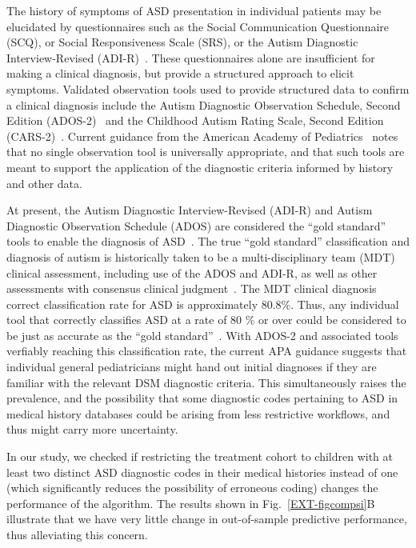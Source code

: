 \documentclass[onecolumn,,10pt]{IEEEtran}
\begin{document}
The history of symptoms of  ASD presentation in individual patients may be elucidated by questionnaires such as
the Social Communication Questionnaire (SCQ), or Social Responsiveness
Scale (SRS), or the Autism Diagnostic Interview-Revised (ADI-R)~\cite{hyman2020identification}. These questionnaires alone are insufficient for making a clinical diagnosis, but provide a structured approach to
elicit symptoms. Validated observation tools used to provide structured data to confirm a clinical diagnosis include the Autism Diagnostic Observation Schedule,
Second Edition (ADOS-2)~\cite{esler2015autism} and the
Childhood Autism Rating Scale,
Second Edition (CARS-2)~\cite{chlebowski2010using}. Current guidance from the American Academy of Pediatrics~\cite{hyman2020identification}   notes that no single
observation tool is universally appropriate,
and that such tools are meant to support the application of the diagnostic criteria informed by history
and other data.

At present, the Autism Diagnostic Interview-Revised (ADI-R) and Autism Diagnostic Observation
Schedule (ADOS) are considered the ``gold
standard'' tools to enable the  diagnosis of ASD~\cite{falkmer2013diagnostic}. 
The true  ``gold standard'' classification and diagnosis of autism is historically taken to be a multi-disciplinary team (MDT) clinical assessment, including use of the ADOS and
ADI-R, as well as other assessments with consensus clinical judgment~\cite{falkmer2013diagnostic}.  
The MDT clinical diagnosis correct classification rate for ASD is approximately 80.8\%. Thus, any individual tool that correctly classifies ASD at a rate of 80 \% or over could be considered to be just as accurate as the ``gold standard''~\cite{falkmer2013diagnostic}. With ADOS-2 and associated tools verfiably  reaching this classification rate, the current APA guidance suggests that individual general pediatricians might hand out initial diagnoses if they are familiar with the relevant DSM diagnostic criteria. This simultaneously raises the prevalence, and  the possibility that  some diagnostic codes pertaining to ASD in medical history databases could be arising from less restrictive workflows, and thus might carry more uncertainty.

In our study, we checked if restricting the treatment cohort to children with at least two  distinct ASD diagnostic codes in their medical histories instead of one (which significantly reduces the possibility of erroneous coding) changes the performance of the algorithm. The results  shown in Fig.~\ref{EXT-figcompsi}B illustrate that we have very little change in out-of-sample predictive performance, thus alleviating this concern.
\end{document}
